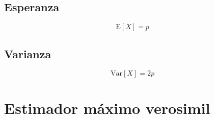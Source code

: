 \documentclass[a4paper, 10pt]{article} %
\begin{document}
\subsection{Esperanza}
$$\mathrm E[X]=p$$

\subsection{Varianza}
$$\mathrm{Var}[X]=2p$$

\section{Estimador máximo verosimil}
\end{document}
